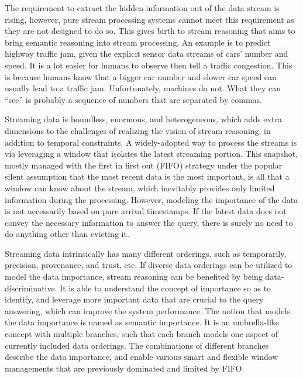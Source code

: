  
The requirement to extract the hidden information out of the data stream is rising, 
however, pure stream processing systems cannot meet this requirement as they are not designed to do so.  
This gives birth to stream reasoning that aims to bring semantic reasoning into stream processing.
An example is to predict highway traffic jam, given the explicit sensor data streams of cars' number and speed.
It is a lot easier for humans to observe then tell a traffic congestion.
This is because humans know that a bigger car number and slower car speed can usually lead to a traffic jam. 
Unfortunately, machines do not.
What they can ``see'' is probably a sequence of numbers that are separated by commas.

Streaming data is boundless, enormous, and heterogeneous, which adds extra dimensions to the challenges of realizing the vision of stream reasoning, in addition to temporal constraints.
A widely-adopted way to process the streams is via leveraging a window that isolates the latest streaming portion. 
This snapshot, mostly managed with the first in first out (FIFO) strategy under the popular silent assumption that the most recent data is the most important, is all that a window can know about the stream, 
which inevitably provides only limited information during the processing.
However, modeling the importance of the data is not necessarily based on pure arrival timestamps. 
If the latest data does not convey the necessary information to answer the query, there is surely no need to do anything other than evicting it. 

Streaming data intrinsically has many different orderings, such as temporarily, precision, provenance, and trust, etc.
If diverse data orderings can be utilized to model the data importance, stream reasoning can be benefited by being data-discriminative.
It is able to understand the concept of importance so as to identify, and leverage more important data that are crucial to the query answering, which can improve the system performance.
The notion that models the data importance is named as semantic importance.
It is an umbrella-like concept with multiple branches, such that each branch models one aspect of currently included data orderings.
The combinations of different branches describe the data importance, and enable various smart and flexible window managements that are previously dominated and limited by FIFO.


